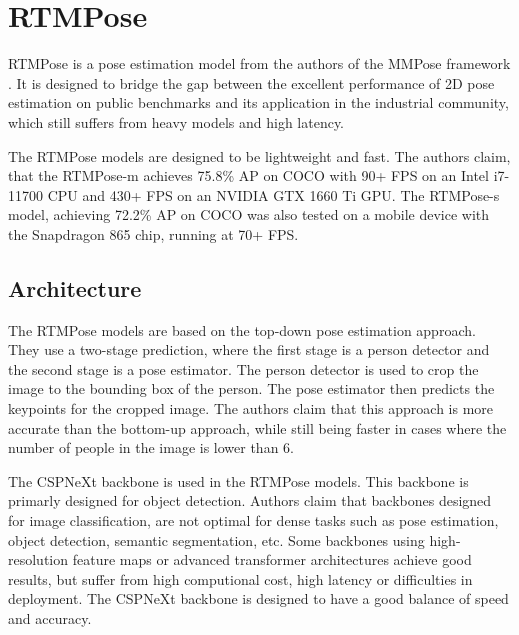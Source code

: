 \section{RTMPose}

RTMPose \cite{rtmpose} is a pose estimation model from the authors of the MMPose framework \cite{mmpose2020}. It is designed to bridge the gap between the excellent performance of 2D pose estimation on public benchmarks and its application in the industrial community, which still suffers from heavy models and high latency.

The RTMPose models are designed to be lightweight and fast. The authors claim, that the RTMPose-m achieves 75.8\% AP on COCO with 90+ FPS on an Intel i7-11700 CPU and 430+ FPS on an NVIDIA GTX 1660 Ti GPU. The RTMPose-s model, achieving 72.2\% AP on COCO was also tested on a mobile device with the Snapdragon 865 chip, running at 70+ FPS.

\subsection{Architecture}

The RTMPose models are based on the top-down pose estimation approach. They use a two-stage prediction, where the first stage is a person detector and the second stage is a pose estimator. The person detector is used to crop the image to the bounding box of the person. The pose estimator then predicts the keypoints for the cropped image. The authors claim that this approach is more accurate than the bottom-up approach, while still being faster in cases where the number of people in the image is lower than 6.

The CSPNeXt backbone is used in the RTMPose models. This backbone is primarly designed for object detection. Authors claim that backbones designed for image classification, are not optimal for dense tasks such as pose estimation, object detection, semantic segmentation, etc. Some backbones using high-resolution feature maps or advanced transformer architectures achieve good results, but suffer from high computional cost, high latency or difficulties in deployment. The CSPNeXt backbone is designed to have a good balance of speed and accuracy.

